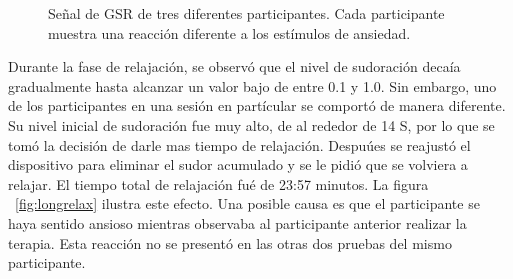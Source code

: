 \begin{figure}[h!]
        \centering
        \caption{Se\~nal de GSR de tres diferentes participantes. Cada participante muestra una reacci\'on diferente a los est\'imulos de ansiedad.}\label{fig:gsrparticipants}
\end{figure}
Durante la fase de relajaci\'on, se observ\'o que el nivel de sudoraci\'on deca\'ia gradualmente hasta alcanzar un valor bajo de entre 0.1 y 1.0. Sin embargo, uno de los participantes en una sesi\'on en part\'icular se comport\'o de manera diferente. Su nivel inicial de sudoraci\'on fue muy alto, de al rededor de 14 \micro S, por lo que se tom\'o la decisi\'on de darle mas tiempo de relajaci\'on. Despu\'ues se reajust\'o el dispositivo para eliminar el sudor acumulado y se le pidi\'o que se volviera a relajar. El tiempo total de relajaci\'on fu\'e de 23:57 minutos. La figura ~\ref{fig:longrelax} ilustra este efecto. Una posible causa es que el participante se haya sentido ansioso mientras observaba al participante anterior realizar la terapia. Esta reacci\'on no se present\'o en las otras dos pruebas del mismo participante.


